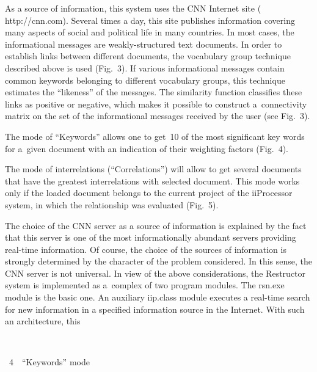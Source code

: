 \begin{multicols}{2}
     As a source of information, this system uses the CNN Internet site ({\sf 
http://cnn.com}). Several times a day, this site publishes information covering many 
aspects of social and political life in many countries. In most cases, the 
informational messages are weakly-structured text documents. In order to establish 
links between different documents, the vocabulary group technique described 
above is used (Fig.~3). If various informational messages contain common 
keywords belonging to different vocabulary groups, this technique estimates the 
``likeness'' of the messages. The similarity function classifies these links as 
positive or negative, which makes it possible to construct a~connectivity matrix on 
the set of the informational messages received by the user (see Fig.~3).
     
    


     The mode of ``Keywords'' allows one to get~10 of the most significant key 
words for a~given document with an indication of their weighting factors (Fig.~4).
     
     
     The mode of interrelations (``Correlations'') will allow to get several 
documents that have the greatest interrelations with selected document. This mode 
works only if the loaded document belongs to the current project of the iiProcessor 
system, in which the relationship was evaluated (Fig.~5).
    
     The choice of the CNN server as a source of information is explained by the 
fact that this server is one of the most informationally abundant servers providing 
real-time information. Of course, the choice of the sources of information is 
strongly determined by the character of the problem considered. In this sense, the 
CNN server is not universal. In view of the above considerations, the Restructor 
system is implemented as a~complex of two program modules. The rsn.exe module 
is the basic one. An auxiliary iip.class module executes a real-time search for new 
information in a specified information source in the Internet. With such an 
architecture, this\linebreak\vspace*{-12pt}

{ \begin{center}  %
 \vspace*{-7pt}
     \mbox{%
 \epsfxsize=79mm 
 }


\vspace*{4pt}


\noindent
{{\figurename~4}\ \ \small{``Keywords'' mode}}
\end{center}
}


\end{multicols}
